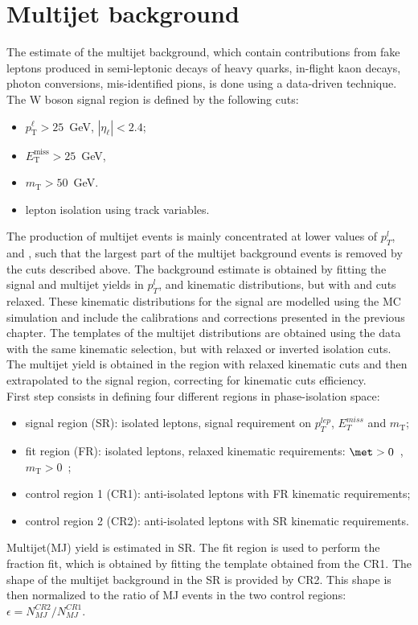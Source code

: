     \section{Multijet background}
 The estimate of the multijet background, which contain contributions from fake leptons produced in semi-leptonic decays of heavy quarks, in-flight kaon decays, photon conversions, mis-identified pions, is done using a data-driven technique. The W boson signal region is defined by the following cuts:
\begin{itemize}
	\item $p_\text{T}^\ell>25$~GeV, $|\eta_\ell|<2.4$;
	\item $E_\text{T}^\text{miss}>25$~GeV,
	\item $m_\text{T}>50$~GeV.
	\item lepton isolation using track variables.
\end{itemize}
The production of multijet events is mainly concentrated at lower values of $p_T^l$, \met and \mt, such that the largest part of the multijet background events is removed by the cuts described above. The background estimate is obtained by fitting the signal and multijet yields in $p_T^l$, \met and \mt kinematic distributions, but with \met and \mt cuts relaxed. These kinematic distributions for the signal are modelled using the MC simulation and include the calibrations and corrections presented in the previous chapter. The templates of the multijet distributions are obtained using the data with the same kinematic selection, but with relaxed or inverted isolation cuts. The multijet yield is obtained in the region with relaxed kinematic cuts and then extrapolated to the signal region, correcting for kinematic cuts efficiency.\\
First step consists in defining four different regions in phase-isolation space:
\begin{itemize}
	\item signal region (SR): isolated leptons, signal requirement on $p_{T}^{lep}$, $E_T^{miss}$ and $m_\text{T}$;
	\item fit region (FR): isolated leptons, relaxed kinematic requirements: $\met>0$~\gev, $m_\text{T}>0$~\gev;
	\item control region 1 (CR1): anti-isolated leptons with FR kinematic requirements;
	\item control region 2 (CR2): anti-isolated leptons with SR kinematic requirements.
\end{itemize}
 Multijet(MJ) yield is estimated in SR. The fit region is used to perform the fraction fit, which is obtained by fitting the template obtained from the CR1. The shape of the multijet background in the SR is provided by CR2. This shape is then normalized to the ratio of MJ events in the two control regions: $\epsilon = N_{MJ}^{CR2}/N_{MJ}^{CR1}$.
